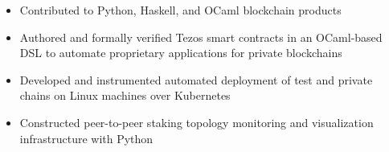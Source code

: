 \documentclass[10pt,a4paper]{altacv}
\newenvironment{tightitemize} %
{\begin{itemize}\itemsep1pt \parskip0pt \parsep0pt}
{\end{itemize}\vspace{-\topsep}}
\begin{document}

\begin{fullwidth}
\makecvheader
\end{fullwidth}



\begin{tightitemize}
    \item Contributed to Python, Haskell, and OCaml blockchain products
    \item Authored and formally verified Tezos smart contracts in an OCaml-based 
        DSL to automate proprietary applications for private blockchains
    \item Developed and instrumented automated deployment of test and private 
        chains on Linux machines over Kubernetes
    \item Constructed peer-to-peer staking topology monitoring and visualization 
        infrastructure with Python
\end{tightitemize}

\smallskip
\divider
\end{document}
